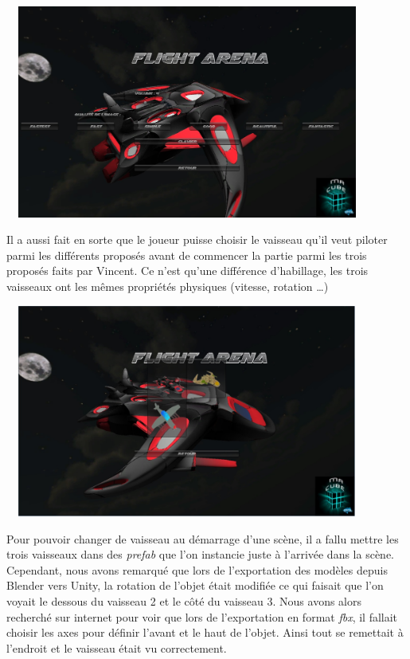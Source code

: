 \documentclass[10pt, titlepage]{report}
\begin{document}
\begin{center}
\includegraphics[height=7cm, width=12cm]{menu_option.jpg}
\end{center}

Il a aussi fait en sorte que le joueur puisse choisir le vaisseau qu'il veut piloter parmi les différents proposés avant de commencer la partie parmi les trois proposés faits par Vincent. Ce n'est qu'une différence d'habillage, les trois vaisseaux ont les mêmes propriétés physiques (vitesse, rotation \dots )\\

\begin{center}
\includegraphics[height=7cm, width=12cm]{menu_selection.jpg}
\end{center}

Pour pouvoir changer de vaisseau au démarrage d'une scène, il a fallu mettre les trois vaisseaux dans des \textit{prefab} que l'on instancie juste à l'arrivée dans la scène. Cependant, nous avons remarqué que lors de l'exportation des modèles depuis Blender vers Unity, la rotation de l'objet était modifiée ce qui faisait que l'on voyait le dessous du vaisseau 2 et le côté du vaisseau 3. Nous avons alors recherché sur internet pour voir que lors de l'exportation en format \textit{fbx}, il fallait choisir les axes pour définir l'avant et le haut de l'objet. Ainsi tout se remettait à l'endroit et le vaisseau était vu correctement.
\end{document}
